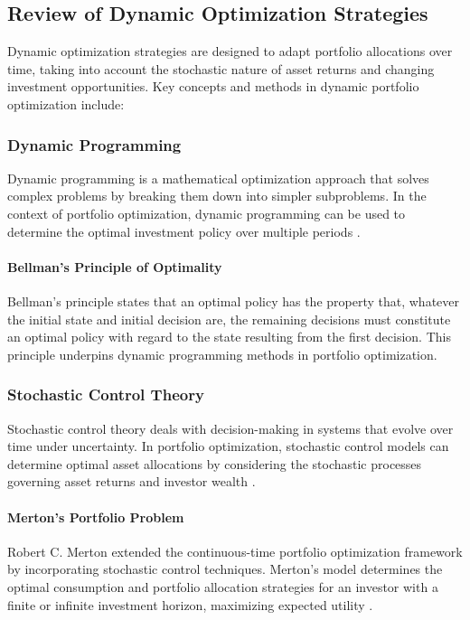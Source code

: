 \subsection{Review of Dynamic Optimization Strategies}

Dynamic optimization strategies are designed to adapt portfolio allocations over time, taking into account the stochastic nature of asset returns and changing investment opportunities. Key concepts and methods in dynamic portfolio optimization include:

\subsubsection{Dynamic Programming}

Dynamic programming is a mathematical optimization approach that solves complex problems by breaking them down into simpler subproblems. In the context of portfolio optimization, dynamic programming can be used to determine the optimal investment policy over multiple periods \cite{bellman1957dynamic}.

\paragraph{Bellman's Principle of Optimality}

Bellman's principle states that an optimal policy has the property that, whatever the initial state and initial decision are, the remaining decisions must constitute an optimal policy with regard to the state resulting from the first decision. This principle underpins dynamic programming methods in portfolio optimization.

\subsubsection{Stochastic Control Theory}

Stochastic control theory deals with decision-making in systems that evolve over time under uncertainty. In portfolio optimization, stochastic control models can determine optimal asset allocations by considering the stochastic processes governing asset returns and investor wealth \cite{merton1969lifetime}.

\paragraph{Merton's Portfolio Problem}

Robert C. Merton extended the continuous-time portfolio optimization framework by incorporating stochastic control techniques. Merton's model determines the optimal consumption and portfolio allocation strategies for an investor with a finite or infinite investment horizon, maximizing expected utility \cite{merton1971optimum}.

